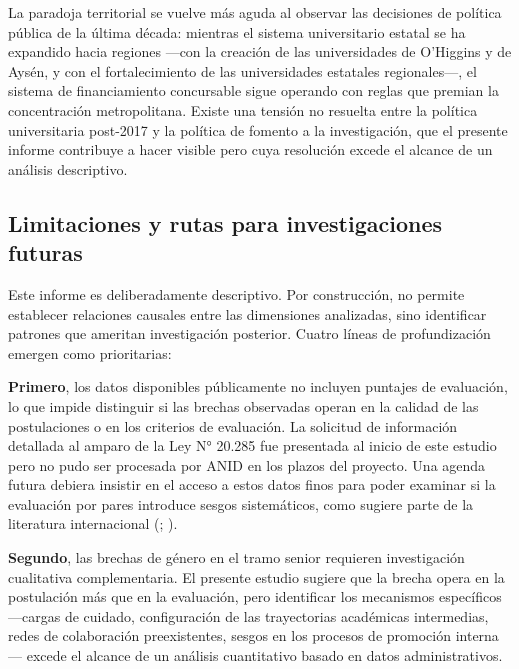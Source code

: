 \documentclass[
  spanish,
  a4paper,
  oneside]{scrbook}
\begin{document}
La paradoja territorial se vuelve más aguda al observar las decisiones
de política pública de la última década: mientras el sistema
universitario estatal se ha expandido hacia regiones ---con la creación
de las universidades de O'Higgins y de Aysén, y con el fortalecimiento
de las universidades estatales regionales---, el sistema de
financiamiento concursable sigue operando con reglas que premian la
concentración metropolitana. Existe una tensión no resuelta entre la
política universitaria post-2017 y la política de fomento a la
investigación, que el presente informe contribuye a hacer visible pero
cuya resolución excede el alcance de un análisis descriptivo.

\subsection{Limitaciones y rutas para investigaciones
futuras}\label{limitaciones-y-rutas-para-investigaciones-futuras}

Este informe es deliberadamente descriptivo. Por construcción, no
permite establecer relaciones causales entre las dimensiones analizadas,
sino identificar patrones que ameritan investigación posterior. Cuatro
líneas de profundización emergen como prioritarias:

\textbf{Primero}, los datos disponibles públicamente no incluyen
puntajes de evaluación, lo que impide distinguir si las brechas
observadas operan en la calidad de las postulaciones o en los criterios
de evaluación. La solicitud de información detallada al amparo de la Ley
N° 20.285 fue presentada al inicio de este estudio pero no pudo ser
procesada por ANID en los plazos del proyecto. Una agenda futura debiera
insistir en el acceso a estos datos finos para poder examinar si la
evaluación por pares introduce sesgos sistemáticos, como sugiere parte
de la literatura internacional
(;
).

\textbf{Segundo}, las brechas de género en el tramo senior requieren
investigación cualitativa complementaria. El presente estudio sugiere
que la brecha opera en la postulación más que en la evaluación, pero
identificar los mecanismos específicos ---cargas de cuidado,
configuración de las trayectorias académicas intermedias, redes de
colaboración preexistentes, sesgos en los procesos de promoción
interna--- excede el alcance de un análisis cuantitativo basado en datos
administrativos.
\end{document}
